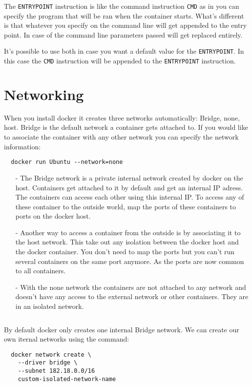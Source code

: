 \documentclass[french]{article}
\begin{document}
The \verb|ENTRYPOINT| instruction is like the command instruction \verb|CMD| as in you can specify the program that will be ran when the container starts. What's different is that whatever you specify on the command line will get appended to the entry point. In case of the command line parameters passed will get replaced entirely.

It's possible to use both in case you want a default value for the \verb|ENTRYPOINT|. In this case the \verb|CMD| instruction will be appended to the \verb|ENTRYPOINT| instruction.

\section{Networking}

When you install docker it creates three networks automatically: Bridge, none, host. Bridge is the default network a container gets attached to. If you would like to associate the container with any other network you can specify the network information:
\begin{verbatim}
  docker run Ubuntu --network=none
\end{verbatim}
\begin{itemize}
  \item [-] The Bridge network is a private internal network created by docker on the host. Containers get attached to it by default and get an internal IP adress. The containers can access each other using this internal IP. To access any of these container to the outside world, map the ports of these containers to ports on the docker host.
  \item [-] Another way to access a container from the outside is by associating it to the host network. This take out any isolation between the docker host and the docker container. You don't need to map the ports but you can't run several containers on the same port anymore. As the ports are now common to all containers.
  \item [-] With the none network the containers are not attached to any network and doesn't have any access to the external network or other containers. They are in an isolated network.
\end{itemize}$ $

By default docker only creates one internal Bridge network. We can create our own iternal networks using the command:
\begin{verbatim}
  docker network create \
    --driver bridge \
    --subnet 182.18.0.0/16
    custom-isolated-network-name
\end{verbatim}
\end{document}
